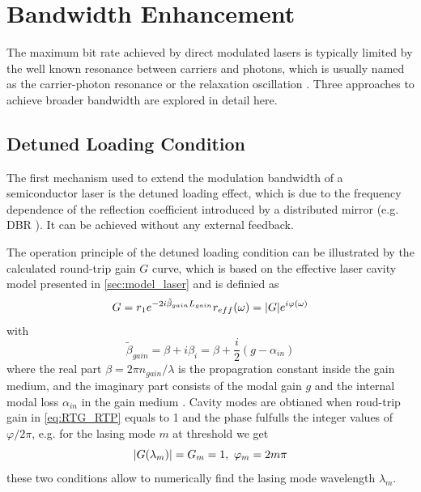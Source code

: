 \section{Bandwidth Enhancement}\label{sec:bandwidth_enhancement}
The maximum bit rate achieved by direct modulated lasers is typically limited by the well known resonance between carriers and photons, which is usually named as the carrier-photon resonance or the relaxation oscillation \cite{coldren2012diode}. Three approaches to achieve broader bandwidth are explored in detail here. 

\subsection{Detuned Loading Condition}\label{subsec:detuned_loading}
The first mechanism used to extend the modulation bandwidth of a semiconductor laser is the detuned loading effect, which is due to the frequency dependence of the reflection coefficient introduced by a distributed mirror (e.g. DBR \cite{feiste1998optimization, kjebon1997two, chacinski2010impact}). It can be achieved without any external feedback. 

The operation principle of the detuned loading condition can be illustrated by the calculated round-trip gain $G$ curve, which is based on the effective laser cavity model presented in \autoref{sec:model_laser} and is definied as \cite{petermann2012laser, vallone2011enhanced}
\begin{equation}
    G=r_1e^{-2i\tilde{\beta}_{gain}L_{gain}}r_{eff}(\omega)=\abs{G}e^{i\varphi(\omega)}
    \label{eq:RTG_RTP}
\end{equation}
with \cite{coldren2012diode}
\begin{equation}
    \tilde{\beta}_{gain}=\beta+i\beta_{i}=\beta+\frac{i}{2}(g-\alpha_{in})
    \label{eq:beta_gain}
\end{equation}
where the real part $\beta=2\pi n_{gain}/\lambda$ is the propagration constant inside the gain medium, and the imaginary part consists of the modal gain $g$ and the internal modal loss $\alpha_{in}$ in the gain medium \cite{coldren2012diode}. Cavity modes are obtianed when roud-trip gain in \autoref{eq:RTG_RTP} equals to 1 and the phase fulfulls the integer values of $\varphi/2\pi$, e.g. for the lasing mode $m$ at threshold we get \cite{vallone2011enhanced}
\begin{equation}
    \abs{G(\lambda_m)}=G_m=1,\ \varphi_m=2m\pi
    \label{eq:lasing_condition}
\end{equation}
these two conditions allow to numerically find the lasing mode wavelength $\lambda_m$.

